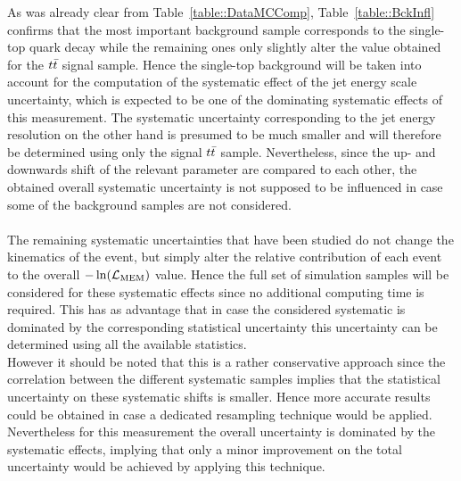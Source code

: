 As was already clear from Table~\ref{table::DataMCComp}, Table~\ref{table::BckInfl} confirms that the most important background sample corresponds to the single-top quark decay while the remaining ones only slightly alter the value obtained for the $t\bar{t}$ signal sample. 
Hence the single-top background will be taken into account for the computation of the systematic effect of the jet energy scale uncertainty, which is expected to be one of the dominating systematic effects of this measurement.
The systematic uncertainty corresponding to the jet energy resolution on the other hand is presumed to be much smaller and will therefore be determined using only the signal $t\bar{t}$ sample.
Nevertheless, since the up- and downwards shift of the relevant parameter are compared to each other, the obtained overall systematic uncertainty is not supposed to be influenced in case some of the background samples are not considered.
\\
\\
The remaining systematic uncertainties that have been studied do not change the kinematics of the event, but simply alter the relative contribution of each event to the overall $-\ln(\mathcal{L}_{\textrm{MEM}})$ value. 
Hence the full set of simulation samples will be considered for these systematic effects since no additional computing time is required. %
This has as advantage that in case the considered systematic is dominated by the corresponding statistical uncertainty this uncertainty can be determined using all the available statistics.
\\
However it should be noted that this is a rather conservative approach since the correlation between the different systematic samples implies that the statistical uncertainty on these systematic shifts is smaller.
Hence more accurate results could be obtained in case a dedicated resampling technique would be applied. Nevertheless for this measurement the overall uncertainty is dominated by the systematic effects, implying that only a minor improvement on the total uncertainty would be achieved by applying this technique.
\\

